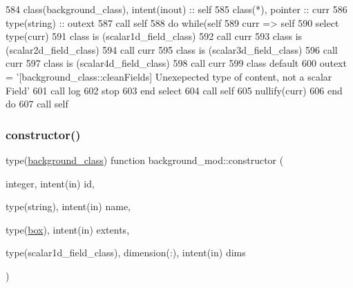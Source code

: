 \begin{DoxyCode}
584     \textcolor{keywordtype}{class}(background\_class), \textcolor{keywordtype}{intent(inout)} :: self
585     \textcolor{keywordtype}{class}(*), \textcolor{keywordtype}{pointer} :: curr
586     \textcolor{keywordtype}{type}(string) :: outext
587     \textcolor{keyword}{call }self%
588     \textcolor{keywordflow}{do} \textcolor{keywordflow}{while}(self%
589         curr => self%
590         \textcolor{keywordflow}{select type}(curr)
591 \textcolor{keywordflow}{        class is} (scalar1d\_field\_class)
592             \textcolor{keyword}{call }curr%
593 \textcolor{keywordflow}{        class is} (scalar2d\_field\_class)
594             \textcolor{keyword}{call }curr%
595 \textcolor{keywordflow}{        class is} (scalar3d\_field\_class)
596             \textcolor{keyword}{call }curr%
597 \textcolor{keywordflow}{        class is} (scalar4d\_field\_class)
598             \textcolor{keyword}{call }curr%
599 \textcolor{keywordflow}{            class default}
600             outext = \textcolor{stringliteral}{'[background\_class::cleanFields] Unexepected type of content, not a scalar Field'}
601             \textcolor{keyword}{call }log%
602             stop
603 \textcolor{keywordflow}{        end select}
604         \textcolor{keyword}{call }self%
605         \textcolor{keyword}{nullify}(curr)
606 \textcolor{keywordflow}{    end do}
607     \textcolor{keyword}{call }self%
\end{DoxyCode}
\mbox{\label{namespacebackground__mod_ad0096fb6a5a11854fd70a7ce58dc3000}} 
\subsubsection{\texorpdfstring{constructor()}{constructor()}}
{\footnotesize\ttfamily type(\mbox{\hyperlink{structbackground__mod_1_1background__class}{background\+\_\+class}}) function background\+\_\+mod\+::constructor (\begin{DoxyParamCaption}\item[{integer, intent(in)}]{id,  }\item[{type(string), intent(in)}]{name,  }\item[{type(\mbox{\hyperlink{structgeometry__mod_1_1box}{box}}), intent(in)}]{extents,  }\item[{type(scalar1d\+\_\+field\+\_\+class), dimension(\+:), intent(in)}]{dims }\end{DoxyParamCaption})\hspace{0.3cm}{\ttfamily [private]}}



